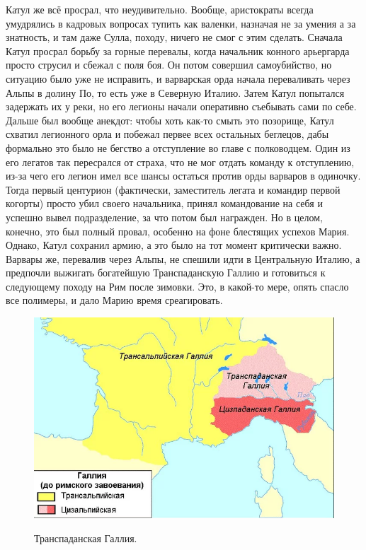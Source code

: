 Катул же всё просрал, что неудивительно. Вообще, аристократы всегда умудрялись в кадровых вопросах тупить как валенки, назначая не за умения а за знатность, и там даже Сулла, походу, ничего не смог с этим сделать. Сначала Катул просрал борьбу за горные перевалы, когда начальник конного арьергарда просто струсил и сбежал с поля боя. Он потом совершил самоубийство, но ситуацию было уже не исправить, и варварская орда начала переваливать через Альпы в долину По, то есть уже в Северную Италию. Затем Катул попытался задержать их у реки, но его легионы начали оперативно съебывать сами по себе. Дальше был вообще анекдот: чтобы хоть как-то смыть это позорище, Катул схватил легионного орла и побежал первее всех остальных беглецов, дабы формально это было не бегство а отступление во главе с полководцем. Один из его легатов так пересрался от страха, что не мог отдать команду к отступлению, из-за чего его легион имел все шансы остаться против орды варваров в одиночку. Тогда первый центурион (фактически, заместитель легата и командир первой когорты) просто убил своего начальника, принял командование на себя и успешно вывел подразделение, за что потом был награжден. Но в целом, конечно, это был полный провал, особенно на фоне блестящих успехов Мария. Однако, Катул сохранил армию, а это было на тот момент критически важно. Варвары же, перевалив через Альпы, не спешили идти в Центральную Италию, а предпочли выжигать богатейшую Транспаданскую Галлию и готовиться к следующему походу на Рим после зимовки. Это, в какой-то мере, опять спасло все полимеры, и дало Марию время среагировать.


\begin{figure}[h!tb]
	\centering\includegraphics[scale=0.5]{kimres/1574758657154051178.png}
	\label{fig:kimr4} %
	\caption{Транспаданская Галлия. }
\end{figure}

